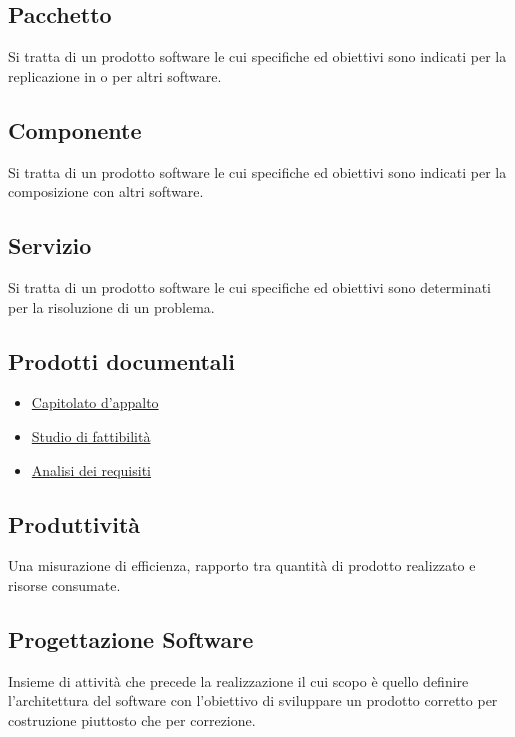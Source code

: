 		\subsection{Pacchetto}
		Si tratta di un prodotto software le cui specifiche ed obiettivi sono indicati per la replicazione in o per altri software.
		
		\subsection{Componente}
		Si tratta di un prodotto software le cui specifiche ed obiettivi sono indicati per la composizione con altri software.
		
		\subsection{Servizio}
		Si tratta di un prodotto software le cui specifiche ed obiettivi sono determinati per la risoluzione di un problema.
	
	\subsection{Prodotti documentali}	
	\label{sec:prodottidocumentali}
	\begin{itemize}  
	\item \hyperref[sec:capitolato]{Capitolato d'appalto}
	\item \hyperref[sec:studiofattibilita]{Studio di fattibilità}
	\item \hyperref[sec:analisirequisiti]{Analisi dei requisiti} 
	\end{itemize}	
		
	\subsection{Produttività}	
	\label{sec:produttivita}
	Una misurazione di efficienza, rapporto tra quantità di prodotto realizzato e risorse consumate.

	\subsection{Progettazione Software}
	\label{sec:progettazionesoftware}
	Insieme di attività che precede la realizzazione il cui scopo è quello definire l'architettura del software con l'obiettivo di sviluppare un prodotto corretto per costruzione piuttosto che per correzione.
	
